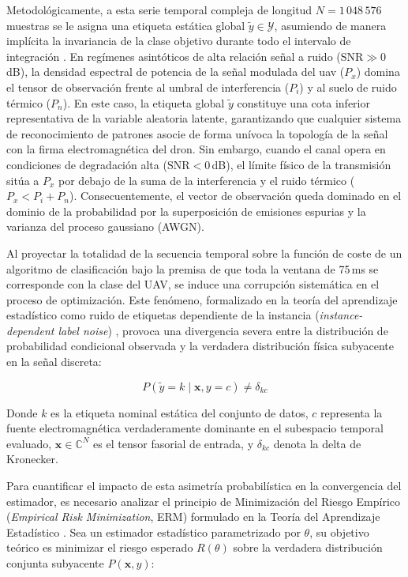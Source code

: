 Metodológicamente, a esta serie temporal compleja de longitud $N = 1\,048\,576$ muestras se le asigna una etiqueta estática global $\tilde{y} \in \mathcal{Y}$, asumiendo de manera implícita la invariancia de la clase objetivo durante todo el intervalo de integración \cite{gluge_robust_2024}. En regímenes asintóticos de alta relación señal a ruido ($\text{SNR} \gg 0$\,dB), la densidad espectral de potencia de la señal modulada del \gls{uav} ($P_x$) domina el tensor de observación frente al umbral de interferencia ($P_i$) y al suelo de ruido térmico ($P_n$). En este caso, la etiqueta global $\tilde{y}$ constituye una cota inferior representativa de la variable aleatoria latente, garantizando que cualquier sistema de reconocimiento de patrones asocie de forma unívoca la topología de la señal con la firma electromagnética del dron. Sin embargo, cuando el canal opera en condiciones de degradación alta ($\text{SNR} < 0$\,dB), el límite físico de la transmisión sitúa a $P_x$ por debajo de la suma de la interferencia y el ruido térmico ($P_x < P_i + P_n$). Consecuentemente, el vector de observación queda dominado en el dominio de la probabilidad por la superposición de emisiones espurias y la varianza del proceso gaussiano (AWGN).

Al proyectar la totalidad de la secuencia temporal sobre la función de coste de un algoritmo de clasificación bajo la premisa de que toda la ventana de 75\,ms se corresponde con la clase del UAV, se induce una corrupción sistemática en el proceso de optimización. Este fenómeno, formalizado en la teoría del aprendizaje estadístico como ruido de etiquetas dependiente de la instancia (\textit{instance-dependent label noise}) \cite{frenay_classification_2014, song_learning_2022}, provoca una divergencia severa entre la distribución de probabilidad condicional observada y la verdadera distribución física subyacente en la señal discreta:

\begin{equation}
    P(\tilde{y} = k \mid \mathbf{x}, y = c) \neq \delta_{kc}
    \label{eq:label_noise}
\end{equation}

Donde $k$ es la etiqueta nominal estática del conjunto de datos, $c$ representa la fuente electromagnética verdaderamente dominante en el subespacio temporal evaluado, $\mathbf{x} \in \mathbb{C}^N$ es el tensor fasorial de entrada, y $\delta_{kc}$ denota la delta de Kronecker.

Para cuantificar el impacto de esta asimetría probabilística en la convergencia del estimador, es necesario analizar el principio de Minimización del Riesgo Empírico (\textit{Empirical Risk Minimization}, ERM) formulado en la Teoría del Aprendizaje Estadístico \cite{vapnik_nature_1998}. Sea un estimador estadístico parametrizado por $\theta$, su objetivo teórico es minimizar el riesgo esperado $R(\theta)$ sobre la verdadera distribución conjunta subyacente $P(\mathbf{x}, y)$:

